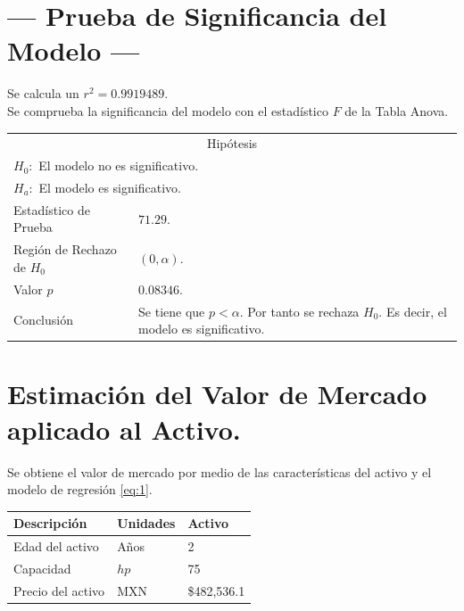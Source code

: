 \documentclass{article}
\begin{document}
\section{\centering --- Prueba de Significancia del Modelo ---} %
Se calcula un \(r ^ 2 = 0.9919489\). \\ 
Se comprueba la significancia del modelo con el estadístico \(F\) de la Tabla Anova.
\begin{center}
  \begin{tabular}{|l|p{6cm}|}
    \cline{1-2}
    \multicolumn{2}{|c|}{Hipótesis}\\ \cline{1-2}
    \multicolumn{2}{|l|}{\(H_0:\) El modelo no es significativo.} \\ 
    \multicolumn{2}{|l|}{\(H_a:\) El modelo es significativo.} \\ \cline{1-2}
    Estadístico de Prueba & \(71.29\).\\ \cline{1-2} 
		Región de Rechazo de \(H_0\) & \((0, \alpha )\).\\ \cline{1-2} 
    Valor \(p\) & \(0.08346\).\\ \cline{1-2} 
    Conclusión & Se tiene que \(p<\alpha\). \newline 
		Por tanto se rechaza \(H_0\). \newline 
		Es decir, el modelo es significativo.\\ \cline{1-2} 
  \end{tabular}
\end{center} 

\section{\centering Estimación del Valor de Mercado aplicado al Activo.} %
Se obtiene el valor de mercado por medio de las características del activo y el modelo de regresión \eqref{eq:1}.
\begin{center}
  \begin{tabular}{|l|l|l|}
    \hline 
		Descripción   & Unidades  & Activo \\ \hline 
    Edad del activo    & Años      & 2      \\ \hline 
		Capacidad  & \(hp\) & 75   \\ \hline 
		Precio del activo   & MXN       & \$482,536.1   \\ \hline 
  \end{tabular}
\end{center} 
\end{document}
